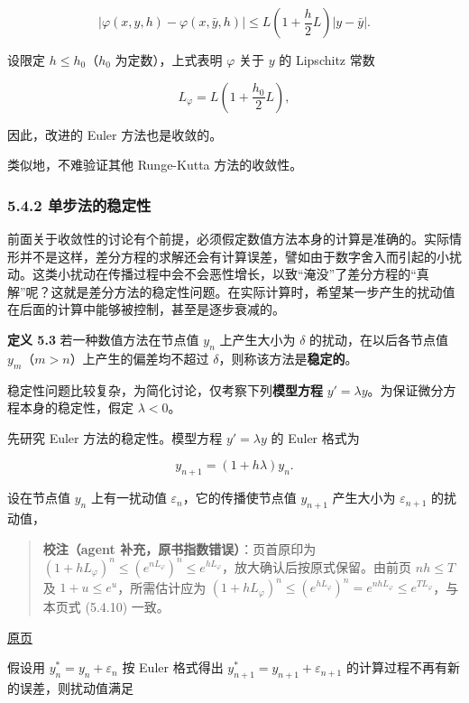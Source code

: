 \documentclass[
  10pt,
  fontset=fandol]{ctexart}
\begin{document}
\[
|\varphi(x,y,h)-\varphi(x,\bar y,h)|\leqslant L\left(1+\frac{h}{2}L\right)|y-\bar y|.
\]

设限定 \(h\leqslant h_0\)（\(h_0\) 为定数），上式表明 \(\varphi\) 关于 \(y\) 的 Lipschitz 常数

\[
L_\varphi=L\left(1+\frac{h_0}{2}L\right),
\]

因此，改进的 Euler 方法也是收敛的。

类似地，不难验证其他 Runge-Kutta 方法的收敛性。

\subsubsection{5.4.2 单步法的稳定性}\label{ux5355ux6b65ux6cd5ux7684ux7a33ux5b9aux6027}

前面关于收敛性的讨论有个前提，必须假定数值方法本身的计算是准确的。实际情形并不是这样，差分方程的求解还会有计算误差，譬如由于数字舍入而引起的小扰动。这类小扰动在传播过程中会不会恶性增长，以致``淹没''了差分方程的``真解''呢？这就是差分方法的稳定性问题。在实际计算时，希望某一步产生的扰动值在后面的计算中能够被控制，甚至是逐步衰减的。

\textbf{定义 5.3} 若一种数值方法在节点值 \(y_n\) 上产生大小为 \(\delta\) 的扰动，在以后各节点值 \(y_m\)（\(m>n\)）上产生的偏差均不超过 \(\delta\)，则称该方法是\textbf{稳定的}。

稳定性问题比较复杂，为简化讨论，仅考察下列\textbf{模型方程} \(y'=\lambda y\)。为保证微分方程本身的稳定性，假定 \(\lambda<0\)。

先研究 Euler 方法的稳定性。模型方程 \(y'=\lambda y\) 的 Euler 格式为

\[
y_{n+1}=(1+h\lambda)y_n.\tag{5.4.11}
\]

设在节点值 \(y_n\) 上有一扰动值 \(\varepsilon_n\)，它的传播使节点值 \(y_{n+1}\) 产生大小为 \(\varepsilon_{n+1}\) 的扰动值，

\begin{quote}
\textbf{校注（agent 补充，原书指数错误）}：页首原印为 \((1+hL_\varphi)^n\leqslant(e^{nL_\varphi})^n\leqslant e^{hL_\varphi}\)，放大确认后按原式保留。由前页 \(nh\leqslant T\) 及 \(1+u\leqslant e^u\)，所需估计应为 \((1+hL_\varphi)^n\leqslant(e^{hL_\varphi})^n=e^{nhL_\varphi}\leqslant e^{TL_\varphi}\)，与本页式 (5.4.10) 一致。
\end{quote}

\href{../../source-images/pdf-136.jpeg}{原页}

假设用 \(y_n^*=y_n+\varepsilon_n\) 按 Euler 格式得出 \(y_{n+1}^*=y_{n+1}+\varepsilon_{n+1}\) 的计算过程不再有新的误差，则扰动值满足
\end{document}
